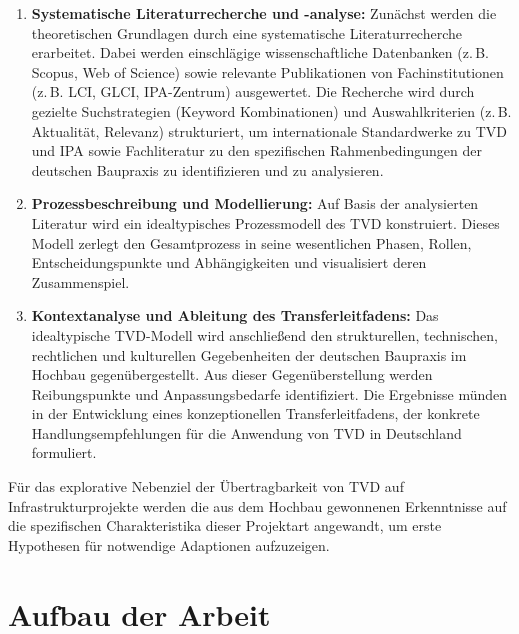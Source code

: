 \begin{enumerate}
    \item \textbf{Systematische Literaturrecherche und -analyse:} Zunächst werden die theoretischen Grundlagen durch eine systematische Literaturrecherche erarbeitet. Dabei werden einschlägige wissenschaftliche Datenbanken (z.\,B. Scopus, Web of Science) sowie relevante Publikationen von Fachinstitutionen (z.\,B. LCI, GLCI, IPA-Zentrum) ausgewertet. Die Recherche wird durch gezielte Suchstrategien (Keyword Kombinationen) und Auswahlkriterien (z.\,B. Aktualität, Relevanz) strukturiert, um internationale Standardwerke zu TVD und IPA sowie Fachliteratur zu den spezifischen Rahmenbedingungen der deutschen Baupraxis zu identifizieren und zu analysieren.
    
    \item \textbf{Prozessbeschreibung und Modellierung:} Auf Basis der analysierten Literatur wird ein idealtypisches Prozessmodell des TVD konstruiert. Dieses Modell zerlegt den Gesamtprozess in seine wesentlichen Phasen, Rollen, Entscheidungspunkte und Abhängigkeiten und visualisiert deren Zusammenspiel.
    
    \item \textbf{Kontextanalyse und Ableitung des Transferleitfadens:} Das idealtypische TVD-Modell wird anschließend den strukturellen, technischen, rechtlichen und kulturellen Gegebenheiten der deutschen Baupraxis im Hochbau gegenübergestellt. Aus dieser Gegenüberstellung werden Reibungspunkte und Anpassungsbedarfe identifiziert. Die Ergebnisse münden in der Entwicklung eines konzeptionellen Transferleitfadens, der konkrete Handlungsempfehlungen für die Anwendung von TVD in Deutschland formuliert.
\end{enumerate}

Für das explorative Nebenziel der Übertragbarkeit von TVD auf Infrastrukturprojekte werden die aus dem Hochbau gewonnenen Erkenntnisse auf die spezifischen Charakteristika dieser Projektart angewandt, um erste Hypothesen für notwendige Adaptionen aufzuzeigen.

\section{Aufbau der Arbeit}
\label{sec:aufbau}
